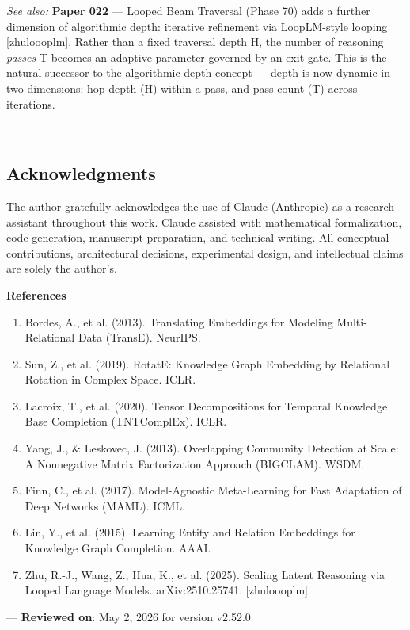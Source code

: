 \textit{See also:} \textbf{Paper 022} — Looped Beam Traversal (Phase 70) adds a further dimension of algorithmic depth: iterative refinement via LoopLM-style looping [zhu\-loooplm]. Rather than a fixed traversal depth H, the number of reasoning \textit{passes} T becomes an adaptive parameter governed by an exit gate. This is the natural successor to the algorithmic depth concept — depth is now dynamic in two dimensions: hop depth (H) within a pass, and pass count (T) across iterations.

---
\subsection{Acknow\-ledgments}

The author gratefully ackno\-wledges the use of Claude (Anthropic) as a research assistant throughout this work. Claude assisted with mathe\-matical forma\-lization, code generation, manuscript preparation, and technical writing. All conceptual contr\-ibutions, archi\-tectural decisions, exper\-imental design, and intel\-lectual claims are solely the author's.

\textbf{References}
\begin{enumerate}
\item Bordes, A., et al. (2013). Translating Embeddings for Modeling Multi-Relational Data (TransE). NeurIPS.
\item Sun, Z., et al. (2019). RotatE: Knowledge Graph Embedding by Relational Rotation in Complex Space. ICLR.
\item Lacroix, T., et al. (2020). Tensor Decomp\-ositions for Temporal Knowledge Base Completion (TNTComplEx). ICLR.
\item Yang, J., \& Leskovec, J. (2013). Overlapping Community Detection at Scale: A Nonnegative Matrix Factor\-ization Approach (BIGCLAM). WSDM.
\item Finn, C., et al. (2017). Model-Agnostic Meta-Learning for Fast Adaptation of Deep Networks (MAML). ICML.
\item Lin, Y., et al. (2015). Learning Entity and Relation Embeddings for Knowledge Graph Completion. AAAI.
\item Zhu, R.-J., Wang, Z., Hua, K., et al. (2025). Scaling Latent Reasoning via Looped Language Models. arXiv:2510.25741. [zhu\-loooplm]

\end{enumerate}
---
\textbf{Reviewed on}: May 2, 2026 for version v2.52.0
